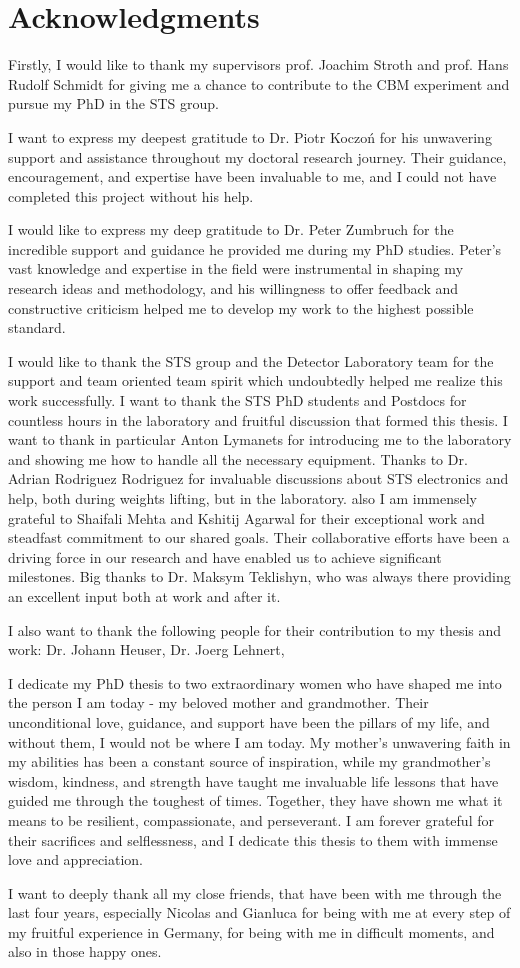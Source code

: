 \chapter{Acknowledgments}
\vspace{2cm}
\vspace{2cm}
Firstly, I would like to thank my supervisors prof. Joachim Stroth and prof. Hans Rudolf Schmidt for giving me a chance to contribute to the CBM experiment and pursue my PhD in the STS group.


I want to express my deepest gratitude to Dr. Piotr Koczoń for his unwavering support and assistance throughout my doctoral research journey. Their guidance, encouragement, and expertise have been invaluable to me, and I could not have completed this project without his help. 


I would like to express my deep gratitude to Dr. Peter Zumbruch for the incredible support and guidance he provided me during my PhD studies. Peter's vast knowledge and expertise in the field were instrumental in shaping my research ideas and methodology, and his willingness to offer feedback and constructive criticism helped me to develop my work to the highest possible standard. 

I would like to thank the STS group and the Detector Laboratory team for the support and team oriented team spirit which undoubtedly helped me realize this work successfully. I want to thank the STS PhD students and Postdocs for countless hours in the laboratory and fruitful discussion that formed this thesis. I want to thank in particular Anton Lymanets for introducing me to the laboratory and showing me how to handle all the necessary equipment. Thanks to Dr. Adrian Rodriguez Rodriguez for invaluable discussions about STS electronics and help, both during weights lifting, but in the laboratory. also I am immensely grateful to Shaifali Mehta and Kshitij Agarwal for their exceptional work and steadfast commitment to our shared goals. Their collaborative efforts have been a driving force in our research and have enabled us to achieve significant milestones. 
Big thanks to Dr. Maksym Teklishyn, who was always there providing an excellent input both at work and after it. 

I also want to thank the following people for their contribution to my thesis and work: Dr. Johann Heuser, Dr. Joerg Lehnert, 

I dedicate my PhD thesis to two extraordinary women who have shaped me into the person I am today - my beloved mother and grandmother. Their unconditional love, guidance, and support have been the pillars of my life, and without them, I would not be where I am today. My mother's unwavering faith in my abilities has been a constant source of inspiration, while my grandmother's wisdom, kindness, and strength have taught me invaluable life lessons that have guided me through the toughest of times. Together, they have shown me what it means to be resilient, compassionate, and perseverant. I am forever grateful for their sacrifices and selflessness, and I dedicate this thesis to them with immense love and appreciation. 

I want to deeply thank all my close friends, that have been with me through the last four years, especially Nicolas and Gianluca for being with me at every step of my fruitful experience in Germany, for being with me in difficult moments, and also in those happy ones.

